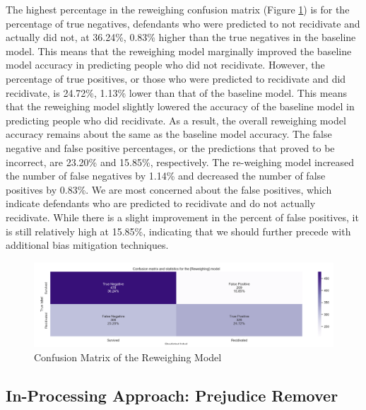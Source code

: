 \documentclass[water,article,submit,moreauthors,pdftex]{mdpi}
\begin{document}
The highest percentage in the reweighing confusion matrix (Figure
\ref{fig:reweighing matrix}) is for the percentage of true negatives,
defendants who were predicted to not recidivate and actually did not, at
36.24\%, 0.83\% higher than the true negatives in the baseline model.
This means that the reweighing model marginally improved the baseline
model accuracy in predicting people who did not recidivate. However, the
percentage of true positives, or those who were predicted to recidivate
and did recidivate, is 24.72\%, 1.13\% lower than that of the baseline
model. This means that the reweighing model slightly lowered the
accuracy of the baseline model in predicting people who did recidivate.
As a result, the overall reweighing model accuracy remains about the
same as the baseline model accuracy. The false negative and false
positive percentages, or the predictions that proved to be incorrect,
are 23.20\% and 15.85\%, respectively. The re-weighing model increased
the number of false negatives by 1.14\% and decreased the number of
false positives by 0.83\%. We are most concerned about the false
positives, which indicate defendants who are predicted to recidivate and
do not actually recidivate. While there is a slight improvement in the
percent of false positives, it is still relatively high at 15.85\%,
indicating that we should further precede with additional bias
mitigation techniques.

\begin{figure}

{\centering \includegraphics[width=1\linewidth]{../images/reweighing_matrix} 

}

\caption{Confusion Matrix of the Reweighing Model}\label{fig:reweighing matrix}
\end{figure}

\hypertarget{in-processing-approach-prejudice-remover}{%
\subsection{In-Processing Approach: Prejudice
Remover}\label{in-processing-approach-prejudice-remover}}
\end{document}
